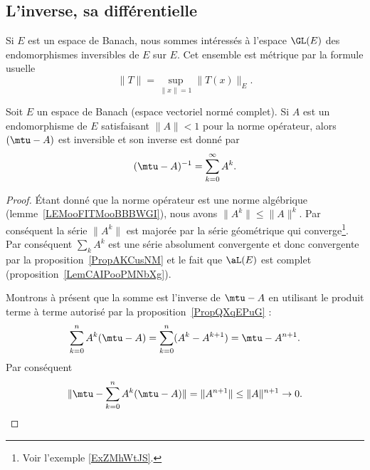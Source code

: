 \subsection{L'inverse, sa différentielle}

Si \( E\) est un espace de Banach, nous sommes intéressés à l'espace \( \GL(E)\) des endomorphismes inversibles de \( E\) sur \( E\). Cet ensemble est métrique par la formule usuelle
\begin{equation}
    \| T \|=\sup_{\| x \|=1}\| T(x) \|_E.
\end{equation}

\begin{proposition}     \label{PropQAjqUNp}
    Soit \( E\) un espace de Banach (espace vectoriel normé complet). Si \( A\) est un endomorphisme de \( E\) satisfaisant  \( \| A \|<1\) pour la norme opérateur, alors \( (\mtu-A)\) est inversible et son inverse est donné par
    \begin{equation}
        (\mtu-A)^{-1}=\sum_{k=0}^{\infty}A^k.
    \end{equation}
\end{proposition}

\begin{proof}
    Étant donné que la norme opérateur est une norme algébrique (lemme~\ref{LEMooFITMooBBBWGI}), nous avons \( \| A^k \|\leq \| A \|^k\). Par conséquent la série \( \| A^k \|\) est majorée par la série géométrique qui converge\footnote{Voir l'exemple \ref{ExZMhWtJS}.}. Par conséquent \( \sum_{k}A^k\) est une série absolument convergente et donc convergente par la proposition~\ref{PropAKCusNM} et le fait que \( \aL(E)\) est complet (proposition~\ref{LemCAIPooPMNbXg}).

    Montrons à présent que la somme est l'inverse de \( \mtu-A\) en utilisant le produit terme à terme autorisé par la proposition~\ref{PropQXqEPuG} :
    \begin{equation}
        \sum_{k=0}^nA^k(\mtu-A)=\sum_{k=0}^n(A^k-A^{k+1})=\mtu-A^{n+1}.
    \end{equation}
    Par conséquent
    \begin{equation}
        \| \mtu-\sum_{k=0}^nA^k(\mtu-A) \|=\| A^{n+1} \|\leq \| A \|^{n+1}\to 0.
    \end{equation}
\end{proof}

